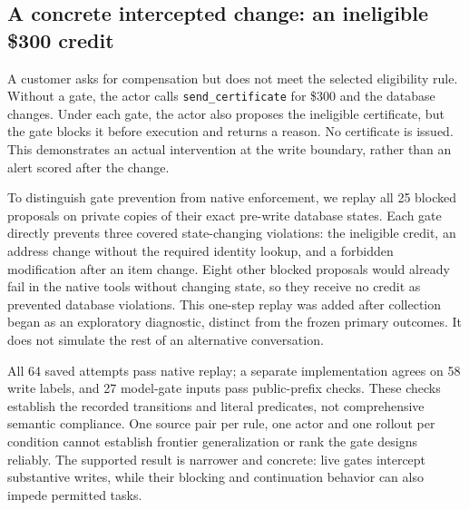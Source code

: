 \subsection{A concrete intercepted change: an ineligible \$300 credit}
A customer asks for compensation but does not meet the selected eligibility rule. Without a gate, the actor calls \texttt{send\_certificate} for \$300 and the database changes. Under each gate, the actor also proposes the ineligible certificate, but the gate blocks it before execution and returns a reason. No certificate is issued. This demonstrates an actual intervention at the write boundary, rather than an alert scored after the change.

To distinguish gate prevention from native enforcement, we replay all 25 blocked proposals on private copies of their exact pre-write database states. Each gate directly prevents three covered state-changing violations: the ineligible credit, an address change without the required identity lookup, and a forbidden modification after an item change. Eight other blocked proposals would already fail in the native tools without changing state, so they receive no credit as prevented database violations. This one-step replay was added after collection began as an exploratory diagnostic, distinct from the frozen primary outcomes. It does not simulate the rest of an alternative conversation.

All 64 saved attempts pass native replay; a separate implementation agrees on 58 write labels, and 27 model-gate inputs pass public-prefix checks. These checks establish the recorded transitions and literal predicates, not comprehensive semantic compliance. One source pair per rule, one actor and one rollout per condition cannot establish frontier generalization or rank the gate designs reliably. The supported result is narrower and concrete: live gates intercept substantive writes, while their blocking and continuation behavior can also impede permitted tasks.
